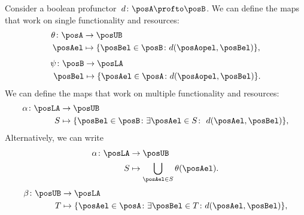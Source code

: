 Consider a boolean profunctor~$d\colon \posA \profto \posB$.
We can define the maps that work on single functionality and resources:
%
\begin{equation}
    \begin{aligned}
        \theta\colon \posA & \to \posUB                                                \\
        \posAel            & \mapsto \{\posBel\in \posB \colon d(\posAopel, \posBel) \},
    \end{aligned}
\end{equation}
%
\begin{equation}
    \begin{aligned}
        \psi\colon \posB & \to \posLA                                                \\
        \posBel          & \mapsto \{\posAel\in \posA \colon d(\posAopel, \posBel) \}.
    \end{aligned}
\end{equation}
We can define the maps that work on multiple functionality and resources:
\begin{equation}
    \label{eq:galoisalfa}
    \begin{aligned}
        \alpha\colon \posLA & \to \posUB                                                                           \\
        S                   & \mapsto \{\posBel\in \posB \colon \exists \posAel\in S\colon \ d(\posAel,\posBel)\},
    \end{aligned}
\end{equation}
Alternatively, we can write
\begin{equation}
    \begin{aligned}
        \alpha \colon \posLA & \to \posUB                                      \\
        S                    & \mapsto \bigcup_{\posAel\in S} \theta(\posAel).
    \end{aligned}
\end{equation}
%
\begin{equation}
    \label{eq:galoisbeta}
    \begin{aligned}
        \beta\colon \posUB & \to \posLA                                                                          \\
        T                  & \mapsto \{\posAel\in \posA  \colon \exists \posBel\in T\colon d(\posAel,\posBel)\},
    \end{aligned}
\end{equation}
